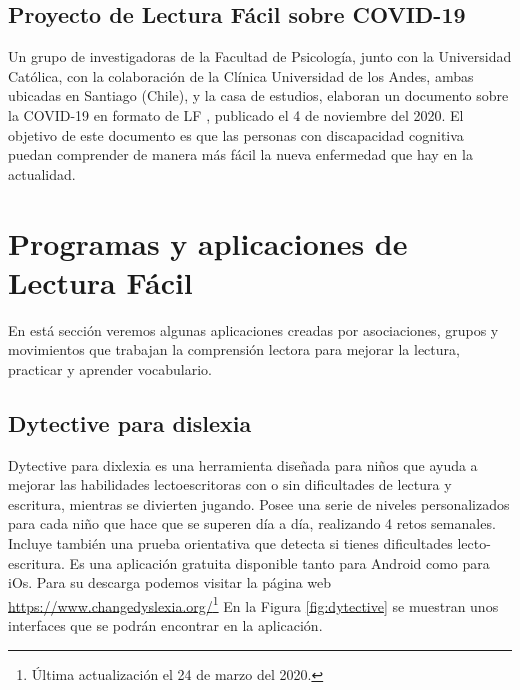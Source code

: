 \subsection{Proyecto de Lectura Fácil sobre COVID-19}
Un grupo de investigadoras de la Facultad de Psicología, junto con la Universidad Católica, con la colaboración de la Clínica Universidad de los Andes, ambas ubicadas en Santiago  (Chile), y la casa de estudios, elaboran un documento sobre la COVID-19 en formato de LF \citep{covid}, publicado el 4 de noviembre del 2020.
El objetivo de este documento es que las personas con discapacidad cognitiva puedan comprender de manera más fácil la nueva enfermedad que hay en la actualidad.


\section{Programas y aplicaciones de Lectura Fácil}

En está sección veremos algunas aplicaciones creadas por asociaciones, grupos y movimientos que trabajan la comprensión lectora para mejorar la lectura, practicar y aprender vocabulario.

\subsection{Dytective para dislexia }
Dytective para dixlexia \citep{rello2018superar} es una herramienta diseñada para niños que ayuda a mejorar las habilidades lectoescritoras con o sin dificultades de lectura y escritura, mientras se divierten jugando. Posee una serie de niveles personalizados para cada niño que hace que se superen día a día, realizando 4 retos semanales. Incluye también una prueba orientativa que detecta si tienes dificultades lecto-escritura.
Es una aplicación gratuita disponible tanto para Android como para iOs. Para su descarga podemos visitar la página web \url{https://www.changedyslexia.org/}\footnote{Última actualización el 24 de marzo del 2020.} En la Figura \ref{fig:dytective} se muestran unos interfaces que se podrán encontrar en la aplicación.


